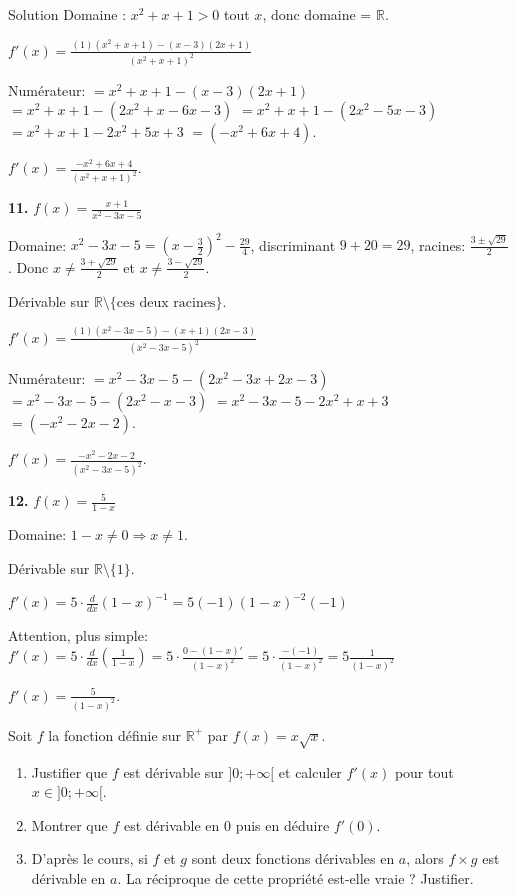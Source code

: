\documentclass[a4paper,12pt]{article}
\begin{document}
\begin{solutionbox}{Solution}
Domaine : $x^2+x+1>0$ tout $x$, donc domaine = $\mathbb{R}$.

$f'(x)=\frac{(1)(x^2+x+1)-(x-3)(2x+1)}{(x^2+x+1)^2}$

Numérateur:
$=x^2+x+1-(x-3)(2x+1)$
$=x^2+x+1-(2x^2+x-6x-3)$
$=x^2+x+1-(2x^2 -5x -3)$
$=x^2+x+1-2x^2+5x+3$
$=(-x^2+6x+4)$.

$f'(x)=\frac{-x^2+6x+4}{(x^2+x+1)^2}$.

\textbf{11.} $f(x)=\frac{x+1}{x^2-3x-5}$

Domaine: $x^2-3x-5=(x-\frac{3}{2})^2 -\frac{29}{4}$, discriminant $9+20=29$, racines: $\frac{3\pm\sqrt{29}}{2}$. Donc $x \neq \frac{3+\sqrt{29}}{2}$ et $x \neq \frac{3-\sqrt{29}}{2}$.

Dérivable sur $\mathbb{R}\setminus\{\text{ces deux racines}\}$.

$f'(x)=\frac{(1)(x^2-3x-5)-(x+1)(2x-3)}{(x^2-3x-5)^2}$

Numérateur:
$=x^2-3x-5-(2x^2-3x+2x-3)$
$=x^2-3x-5-(2x^2 -x -3)$
$=x^2-3x-5-2x^2+x+3$
$=(-x^2 -2x -2)$.

$f'(x)=\frac{-x^2-2x-2}{(x^2 -3x -5)^2}$.

\textbf{12.} $f(x)=\frac{5}{1 - x}$

Domaine: $1-x \neq0 \Rightarrow x\neq1$.

Dérivable sur $\mathbb{R}\setminus\{1\}$.

$f'(x)=5 \cdot \frac{d}{dx}(1-x)^{-1}=5(-1)(1-x)^{-2}(-1)$

Attention, plus simple:
$f'(x)=5 \cdot \frac{d}{dx}(\frac{1}{1-x})=5\cdot\frac{0-(1-x)' }{(1-x)^2}=5 \cdot\frac{-(-1)}{(1-x)^2}=5\frac{1}{(1-x)^2}$

$f'(x)=\frac{5}{(1-x)^2}$.

\end{solutionbox}

\begin{exercice}[title=Exercice 17 $\quad \star \star \quad$ { [Calculer, Raisonner] }]{}{}
    Soit $f$ la fonction définie sur $\mathbb{R}^+$ par $f(x) = x\sqrt{x}$.
    \begin{enumerate}
        \item Justifier que $f$ est dérivable sur $]0; +\infty[$ et calculer $f'(x)$ pour tout $x \in ]0; +\infty[$.
        \item Montrer que $f$ est dérivable en $0$ puis en déduire $f'(0)$.
        \item D’après le cours, si $f$ et $g$ sont deux fonctions dérivables en $a$, alors $f \times g$ est dérivable en $a$. La réciproque de cette propriété est-elle vraie ? Justifier.
    \end{enumerate}
\end{exercice}
\end{document}
